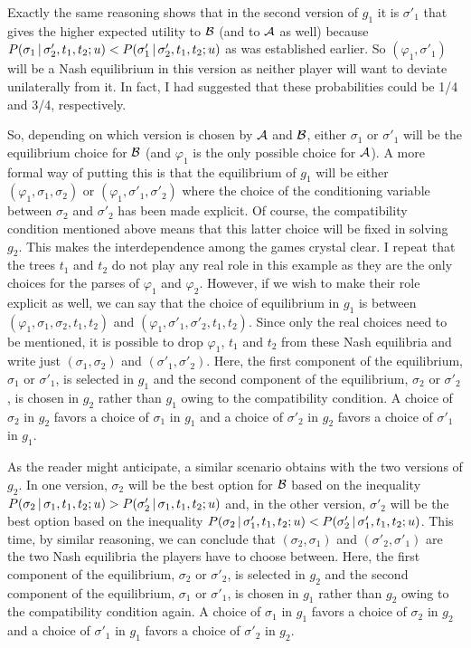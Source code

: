 Exactly the same reasoning shows that in the second version of $g_1$ it is $\sigma'_1$ that gives the higher expected utility to $\cal B$ (and to $\cal A$ as well) because $P(\sigma_1 \,|\, \sigma'_2, t_1,\allowbreak t_2; u) < P(\sigma'_1 \,|\, \sigma'_2, t_1, t_2; u)$ as was established earlier. So $(\varphi_1, \sigma'_1)$ will be a Nash equilibrium in this version as neither player will want to deviate unilaterally from it. In fact, I had suggested that these probabilities could be 1/4 and 3/4, respectively. 

So, depending on which version is chosen by $\cal A$ and $\cal B$, either $\sigma_1$ or $\sigma'_1$ will be the equilibrium choice for $\cal B$ (and $\varphi_1$ is the only possible choice for $\cal A$). A more formal way of putting this is that the equilibrium of $g_1$ will be either $(\varphi_1, \sigma_1, \sigma_2)$ or $(\varphi_1, \sigma'_1, \sigma'_2)$ where the choice of the conditioning variable between $\sigma_2$ and $\sigma'_2$ has been made explicit. Of course, the compatibility condition mentioned above means that this latter choice will be fixed in solving $g_2$. This makes the interdependence among the games crystal clear. I repeat that the trees $t_1$ and $t_2$ do not play any real role in this example as they are the only choices for the parses of $\varphi_1$ and $\varphi_2$. However, if we wish to make their role explicit as well, we can say that the choice of equilibrium in $g_1$ is between $(\varphi_1, \sigma_1, \sigma_2, t_1, t_2)$ and $(\varphi_1, \sigma'_1, \sigma'_2, t_1, t_2)$. Since only the real choices need to be mentioned, it is possible to drop $\varphi_1$, $t_1$ and $t_2$ from these Nash equilibria and write just $(\sigma_1, \sigma_2)$ and $(\sigma'_1, \sigma'_2)$. Here, the first component of the equilibrium, $\sigma_1$ or $\sigma'_1$, is selected in $g_1$ and the second component of the equilibrium, $\sigma_2$ or $\sigma'_2$, is chosen in $g_2$ rather than $g_1$ owing to the compatibility condition. A choice of $\sigma_2$ in $g_2$ favors a choice of $\sigma_1$ in $g_1$ and a choice of $\sigma'_2$ in $g_2$ favors a choice of $\sigma'_1$ in $g_1$.

As the reader might anticipate, a similar scenario obtains with the two versions of $g_2$. In one version, $\sigma_2$ will be the best option for $\cal B$ based on the inequality $P(\sigma_2 \,|\, \sigma_1, t_1, t_2; u) > P(\sigma'_2 \,|\, \sigma_1, t_1, t_2; u)$ and, in the other version, $\sigma'_2$ will be the best option based on the inequality $P(\sigma_2 \,|\, \sigma'_1, t_1, t_2; u) < P(\sigma'_2 \,|\, \sigma'_1, t_1, t_2; u)$. This time, by similar reasoning, we can conclude that $(\sigma_2, \sigma_1)$ and $(\sigma'_2, \sigma'_1)$ are the two Nash equilibria the players have to choose between. Here, the first component of the equilibrium, $\sigma_2$ or $\sigma'_2$, is selected in $g_2$ and the second component of the equilibrium, $\sigma_1$ or $\sigma'_1$, is chosen in $g_1$ rather than $g_2$ owing to the compatibility condition again. A choice of $\sigma_1$ in $g_1$ favors a choice of $\sigma_2$ in $g_2$ and a choice of $\sigma'_1$ in $g_1$ favors a choice of $\sigma'_2$ in $g_2$.

